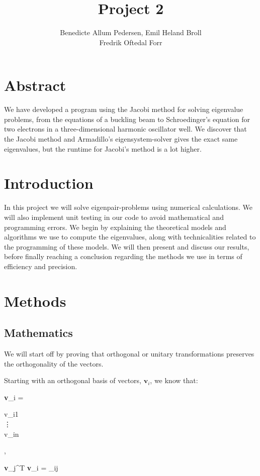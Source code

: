 \documentclass{article}
\title{Project 2}\vspace{-3ex}
\author{Benedicte Allum Pedersen, Emil Heland Broll\\ Fredrik Oftedal Forr}
\date{\vspace{-5ex}}
\begin{document}
\maketitle

\section{Abstract}
	We have developed a program using the Jacobi method for solving eigenvalue problems, from the equations of a buckling beam to Schroedinger's equation for two electrons in a three-dimensional harmonic oscillator well. We discover that the Jacobi method and Armadillo's eigensystem-solver gives the exact same eigenvalues, but the runtime for Jacobi's method is a lot higher.

\section{Introduction}
	In this project we will solve eigenpair-problems using numerical calculations. We will also implement unit testing in our code to avoid mathematical and programming errors. We begin by explaining the theoretical models and algorithms we use to compute the eigenvalues,
	along with technicalities related to the programming of these models. We will then present and discuss our results, before finally reaching a conclusion regarding the methods we use
	in terms of efficiency and precision.

\section{Methods}
	\subsection{Mathematics}
		We will start off by proving that orthogonal or unitary transformations preserves
		the orthogonality of the vectors.

		Starting with an orthogonal basis of vectors, $\textbf{v}_i$, we know that:

		\begin{flalign*}
		\begin{aligned}
			\textbf{v}_i = \begin{bmatrix}
			v_{i1} \\
			\vdots \\
			v_{in}
			\end{bmatrix},
		\end{aligned}
		\qquad
		\begin{aligned}
			\textbf{v}_j^T \textbf{v}_i = \delta_{ij}
		\end{aligned}
		\end{flalign*}
\end{document}
